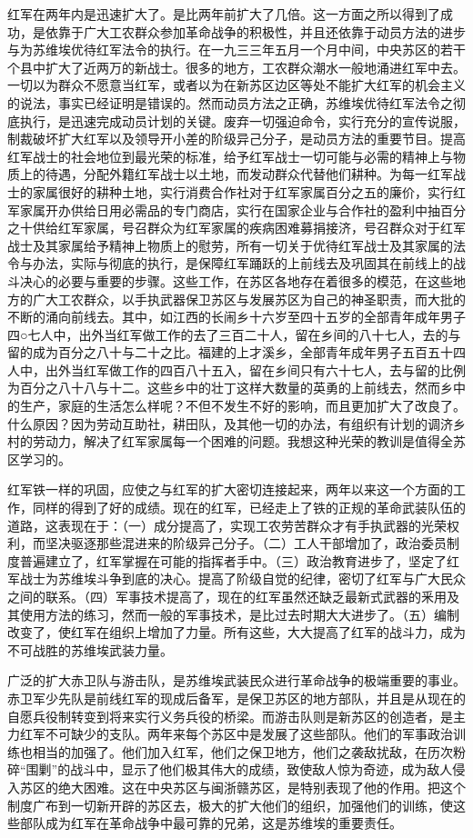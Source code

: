 红军在两年内是迅速扩大了。是比两年前扩大了几倍。这一方面之所以得到了成功，是依靠于广大工农群众参加革命战争的积极性，并且还依靠于动员方法的进步与为苏维埃优待红军法令的执行。在一九三三年五月一个月中间，中央苏区的若干个县中扩大了近两万的新战士。很多的地方，工农群众潮水一般地涌进红军中去。一切以为群众不愿意当红军，或者以为在新苏区边区等处不能扩大红军的机会主义的说法，事实已经证明是错误的。然而动员方法之正确，苏维埃优待红军法令之彻底执行，是迅速完成动员计划的关键。废弃一切强迫命令，实行充分的宣传说服，制裁破坏扩大红军以及领导开小差的阶级异己分子，是动员方法的重要节目。提高红军战士的社会地位到最光荣的标准，给予红军战士一切可能与必需的精神上与物质上的待遇，分配外籍红军战士以土地，而发动群众代替他们耕种。为每一红军战士的家属很好的耕种土地，实行消费合作社对于红军家属百分之五的廉价，实行红军家属开办供给日用必需品的专门商店，实行在国家企业与合作社的盈利中抽百分之十供给红军家属，号召群众为红军家属的疾病困难募捐接济，号召群众对于红军战士及其家属给予精神上物质上的慰劳，所有一切关于优待红军战士及其家属的法令与办法，实际与彻底的执行，是保障红军踊跃的上前线去及巩固其在前线上的战斗决心的必要与重要的步骤。这些工作，在苏区各地存在着很多的模范，在这些地方的广大工农群众，以手执武器保卫苏区与发展苏区为自己的神圣职责，而大批的不断的涌向前线去。其中，如江西的长闹乡十六岁至四十五岁的全部青年成年男子四○七人中，出外当红军做工作的去了三百二十人，留在乡间的八十七人，去的与留的成为百分之八十与二十之比。福建的上才溪乡，全部青年成年男子五百五十四人中，出外当红军做工作的四百八十五入，留在乡间只有六十七人，去与留的比例为百分之八十八与十二。这些乡中的壮丁这样大数量的英勇的上前线去，然而乡中的生产，家庭的生活怎么样呢？不但不发生不好的影响，而且更加扩大了改良了。什么原因？因为劳动互助社，耕田队，及其他一切的办法，有组织有计划的调济乡村的劳动力，解决了红军家属每一个困难的问题。我想这种光荣的教训是值得全苏区学习的。

红军铁一样的巩固，应使之与红军的扩大密切连接起来，两年以来这一个方面的工作，同样的得到了好的成绩。现在的红军，已经走上了铁的正规的革命武装队伍的道路，这表现在于：（一）成分提高了，实现工农劳苦群众才有手执武器的光荣权利，而坚决驱逐那些混进来的阶级异己分子。（二）工人干部增加了，政治委员制度普遍建立了，红军掌握在可能的指挥者手中。（三）政治教育进步了，坚定了红军战士为苏维埃斗争到底的决心。提高了阶级自觉的纪律，密切了红军与广大民众之间的联系。（四）军事技术提高了，现在的红军虽然还缺乏最新式武器的釆用及其使用方法的练习，然而一般的军事技术，是比过去时期大大进步了。（五）编制改变了，使红军在组织上增加了力量。所有这些，大大提高了红军的战斗力，成为不可战胜的苏维埃武装力量。

广泛的扩大赤卫队与游击队，是苏维埃武装民众进行革命战争的极端重要的事业。赤卫军少先队是前线红军的现成后备军，是保卫苏区的地方部队，并且是从现在的自愿兵役制转变到将来实行义务兵役的桥梁。而游击队则是新苏区的创造者，是主力红军不可缺少的支队。两年来每个苏区中是发展了这些部队。他们的军事政治训练也相当的加强了。他们加入红军，他们之保卫地方，他们之袭敌扰敌，在历次粉碎“围剿”的战斗中，显示了他们极其伟大的成绩，致使敌人惊为奇迹，成为敌人侵入苏区的绝大困难。这在中央苏区与闽浙赣苏区，是特别表现了他的作用。把这个制度广布到一切新开辟的苏区去，极大的扩大他们的组织，加强他们的训练，使这些部队成为红军在革命战争中最可靠的兄弟，这是苏维埃的重要责任。

